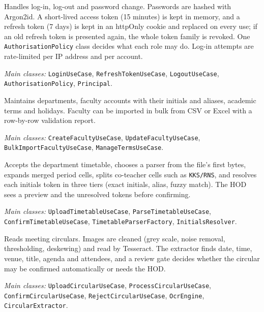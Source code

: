 Handles log-in, log-out and password change. Passwords are hashed with Argon2id. A short-lived access token (15 minutes) is kept in memory, and a refresh token (7 days) is kept in an httpOnly cookie and replaced on every use; if an old refresh token is presented again, the whole token family is revoked. One \texttt{AuthorisationPolicy} class decides what each role may do. Log-in attempts are rate-limited per IP address and per account.\par\smallskip
{\RaggedRight\textit{Main classes:} \texttt{LoginUseCase}, \texttt{RefreshTokenUseCase}, \texttt{LogoutUseCase}, \texttt{AuthorisationPolicy}, \texttt{Principal}.\par}

Maintains departments, faculty accounts with their initials and aliases, academic terms and holidays. Faculty can be imported in bulk from CSV or Excel with a row-by-row validation report.\par\smallskip
{\RaggedRight\textit{Main classes:} \texttt{CreateFacultyUseCase}, \texttt{UpdateFacultyUseCase}, \texttt{BulkImportFacultyUseCase}, \texttt{ManageTermsUseCase}.\par}

Accepts the department timetable, chooses a parser from the file's first bytes, expands merged period cells, splits co-teacher cells such as \texttt{KKS/RNS}, and resolves each initials token in three tiers (exact initials, alias, fuzzy match). The HOD sees a preview and the unresolved tokens before confirming.\par\smallskip
{\RaggedRight\textit{Main classes:} \texttt{UploadTimetableUseCase}, \texttt{ParseTimetableUseCase}, \texttt{ConfirmTimetableUseCase}, \texttt{TimetableParserFactory}, \texttt{InitialsResolver}.\par}

Reads meeting circulars. Images are cleaned (grey scale, noise removal, thresholding, deskewing) and read by Tesseract. The extractor finds date, time, venue, title, agenda and attendees, and a review gate decides whether the circular may be confirmed automatically or needs the HOD.\par\smallskip
{\RaggedRight\textit{Main classes:} \texttt{UploadCircularUseCase}, \texttt{ProcessCircularUseCase}, \texttt{ConfirmCircularUseCase}, \texttt{RejectCircularUseCase}, \texttt{OcrEngine}, \texttt{CircularExtractor}.\par}

